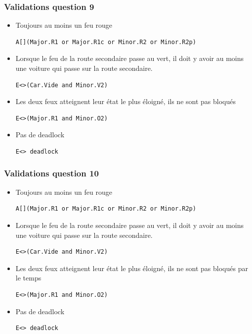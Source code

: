 \documentclass[pdftex,12pt,a4paper]{article}
\begin{document}
\subsubsection{Validations question 9}

\begin{itemize}
	\item Toujours au moins un feu rouge
\begin{verbatim}
A[](Major.R1 or Major.R1c or Minor.R2 or Minor.R2p)
\end{verbatim}

	\item Lorsque le feu de la route secondaire passe au vert, il doit y avoir au moins une voiture qui passe sur la route secondaire.
\begin{verbatim}
E<>(Car.Vide and Minor.V2)
\end{verbatim}

	\item Les deux feux atteignent leur état le plus éloigné, ils ne sont pas bloqués
\begin{verbatim}
E<>(Major.R1 and Minor.O2)
\end{verbatim}

	\item Pas de deadlock
\begin{verbatim}
E<> deadlock
\end{verbatim}

\end{itemize}

\subsubsection{Validations question 10}

\begin{itemize}
	\item Toujours au moins un feu rouge
\begin{verbatim}
A[](Major.R1 or Major.R1c or Minor.R2 or Minor.R2p)
\end{verbatim}

	\item Lorsque le feu de la route secondaire passe au vert, il doit y avoir au moins une voiture qui passe sur la route secondaire.
\begin{verbatim}
E<>(Car.Vide and Minor.V2)
\end{verbatim}

	\item Les deux feux atteignent leur état le plus éloigné, ils ne sont pas bloqués par le temps
\begin{verbatim}
E<>(Major.R1 and Minor.O2)
\end{verbatim}

	\item Pas de deadlock
\begin{verbatim}
E<> deadlock
\end{verbatim}
\end{itemize}
\end{document}
